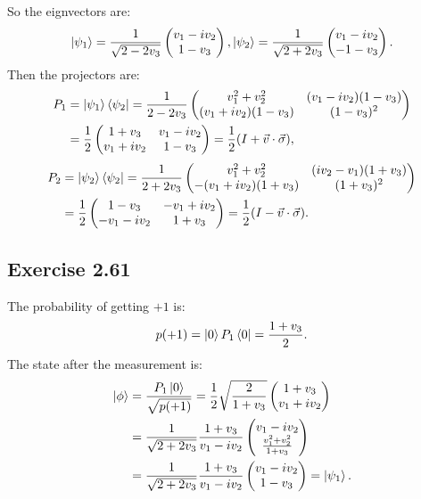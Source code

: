 So the eignvectors are:
\begin{align}
\ket{\psi_1}=\frac{1}{\sqrt{2-2v_3}}\begin{pmatrix}
v_1-iv_2\\1-v_3
\end{pmatrix},
\ket{\psi_2}=\frac{1}{\sqrt{2+2v_3}}\begin{pmatrix}
v_1-iv_2\\-1-v_3
\end{pmatrix}.
\end{align}
Then the projectors are:
\begin{align}
P_1&=\ket{\psi_1}\bra{\psi_2}=\frac{1}{2-2v_3}
\begin{pmatrix}
v_1^2+v_2^2 & (v_1-iv_2)(1-v_3)\\(v_1+iv_2)(1-v_3) & (1-v_3)^2
\end{pmatrix}\\
&=\frac{1}{2}\begin{pmatrix}
1+v_3 & v_1-iv_2\\v_1+iv_2 & 1-v_3
\end{pmatrix}=\frac{1}{2}(I+\vec v\cdot\vec\sigma)
,
\end{align}
\begin{align}
P_2&=\ket{\psi_2}\bra{\psi_2}=\frac{1}{2+2v_3}
\begin{pmatrix}
v_1^2+v_2^2 & (iv_2-v_1)(1+v_3)\\-(v_1+iv_2)(1+v_3) & (1+v_3)^2
\end{pmatrix}\\
&=\frac{1}{2}\begin{pmatrix}
1-v_3 & -v_1+iv_2\\-v_1-iv_2 & 1+v_3
\end{pmatrix}=\frac{1}{2}(I-\vec v\cdot\vec\sigma)
.
\end{align}

\subsection*{Exercise 2.61}
The probability of getting $+1$ is:
\begin{align}
p(+1)=\ket{0}P_1\bra{0}=\frac{1+v_3}{2}.
\end{align}
The state after the measurement is:
\begin{align}
\ket{\phi}&=\frac{P_1\ket{0}}{\sqrt{p(+1)}}=
\frac{1}{2}\sqrt{\frac{2}{1+v_3}}\begin{pmatrix}
1+v_3 \\ v_1+iv_2
\end{pmatrix}\\
&=\frac{1}{\sqrt{2+2v_3}}\frac{1+v_3}{v_1-iv_2}\begin{pmatrix}
v_1-iv_2\\\frac{v_1^2+v_2^2}{1+v_3}
\end{pmatrix}\\
&=\frac{1}{\sqrt{2+2v_3}}\frac{1+v_3}{v_1-iv_2}\begin{pmatrix}
v_1-iv_2\\1-v_3
\end{pmatrix}=\ket{\psi_1}.
\end{align}

